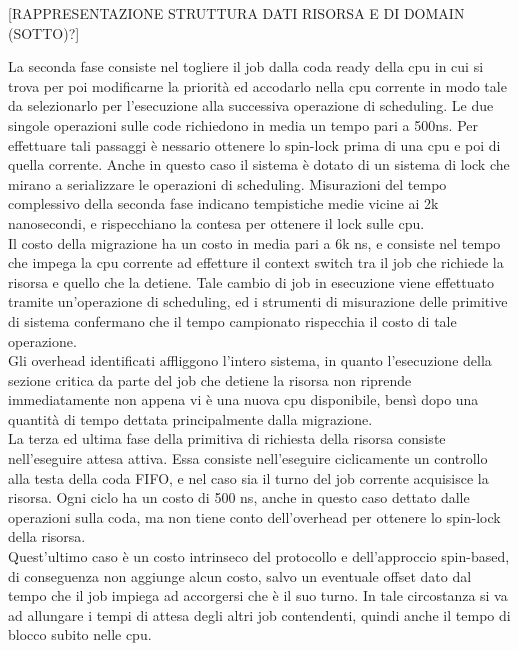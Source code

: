 [RAPPRESENTAZIONE STRUTTURA DATI RISORSA E DI DOMAIN (SOTTO)?]

\noindent La seconda fase consiste nel togliere il job dalla coda ready della cpu in cui si trova per poi modificarne la priorità ed accodarlo nella cpu corrente in modo tale da selezionarlo per l'esecuzione alla successiva operazione di scheduling. Le due singole operazioni sulle code richiedono in media un tempo pari a 500ns. Per effettuare tali passaggi è nessario ottenere lo spin-lock prima di una cpu e poi di quella corrente. Anche in questo caso il sistema è dotato di un sistema di lock che mirano a serializzare le operazioni di scheduling. Misurazioni del tempo complessivo della seconda fase indicano tempistiche medie vicine ai 2k nanosecondi, e rispecchiano la contesa per ottenere il lock sulle cpu.\\

\noindent Il costo della migrazione ha un costo in media pari a 6k ns, e consiste nel tempo che impega la cpu corrente ad effetture il context switch tra il job che richiede la risorsa e quello che la detiene. Tale cambio di job in esecuzione viene effettuato tramite un'operazione di scheduling, ed i strumenti di misurazione delle primitive di sistema confermano che il tempo campionato rispecchia il costo di tale operazione.\\

\noindent Gli overhead identificati affliggono l'intero sistema, in quanto l'esecuzione della sezione critica da parte del job che detiene la risorsa non riprende immediatamente non appena vi è una nuova cpu disponibile, bensì dopo una quantità di tempo dettata principalmente dalla migrazione.\\

\noindent La terza ed ultima fase della primitiva di richiesta della risorsa consiste nell'eseguire attesa attiva. Essa consiste nell'eseguire ciclicamente un controllo alla testa della coda FIFO, e nel caso sia il turno del job corrente acquisisce la risorsa. Ogni ciclo ha un costo di 500 ns, anche in questo caso dettato dalle operazioni sulla coda, ma non tiene conto dell'overhead per ottenere lo spin-lock della risorsa.\\

\noindent Quest'ultimo caso è un costo intrinseco del protocollo e dell'approccio spin-based, di conseguenza non aggiunge alcun costo, salvo un eventuale offset dato dal tempo che il job impiega ad accorgersi che è il suo turno. In tale circostanza si va ad allungare i tempi di attesa degli altri job contendenti, quindi anche il tempo di blocco subito nelle cpu.\\

